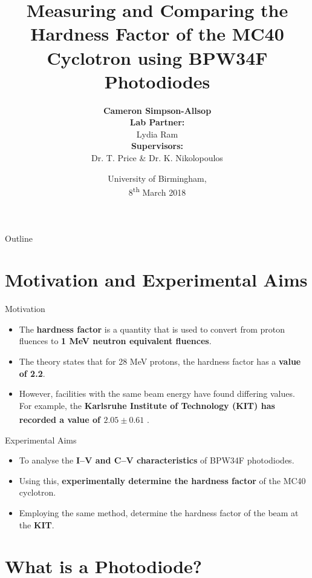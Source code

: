 \documentclass{beamer}
\title{Measuring and Comparing the Hardness Factor of the MC40 Cyclotron using BPW34F Photodiodes}
\author{\large{\textbf{Cameron Simpson-Allsop}} \\ \vspace{0.5cm} \small{\textbf{Lab Partner:}} \\ \small{Lydia Ram} \\ \vspace{0.5cm} \small{\textbf{Supervisors:}} \\ \small{Dr. T. Price \& Dr. K. Nikolopoulos}\vspace{-0.6cm}}
\date{University of Birmingham, \\ \vspace{0.1cm} 8\textsuperscript{th} March 2018}
\begin{document}
    \begin{frame}
      \titlepage
    \end{frame}

    \begin{frame}{Outline}
      \tableofcontents
    \end{frame}

\section{Motivation and Experimental Aims}
    
    \begin{frame}{Motivation}
        \begin{itemize}
            \item The \textbf{hardness factor} is a quantity that is used to convert from proton fluences to \textbf{1 MeV neutron equivalent fluences}.
            \vspace{0.5cm}
            \item The theory states that for 28 MeV protons, the hardness factor has a \textbf{value of 2.2}.
            \vspace{0.5cm}
            \item However, facilities with the same beam energy have found differing values. For example, the \textbf{Karlsruhe Institute of Technology (KIT) has recorded a value of $\bm{2.05 \pm 0.61}$} \textsuperscript{\cite{Karlsruhe}}.
        \end{itemize}
    \end{frame}
    
    \begin{frame}{Experimental Aims}
        \begin{itemize}
            \item To analyse the \textbf{I--V and C--V characteristics} of BPW34F photodiodes.
            \vspace{0.5cm}
            \item Using this, \textbf{experimentally determine the hardness factor} of the MC40 cyclotron.
            \vspace{0.5cm}
            \item Employing the same method, determine the hardness factor of the beam at the \textbf{KIT}.
        \end{itemize}
    \end{frame}

\section{What is a Photodiode?}
\end{document}
